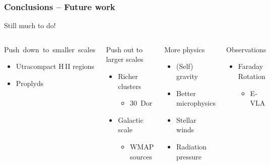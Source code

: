 \documentclass{beamer}
\begin{document}
\begin{frame}
  \frametitle{Conclusions -- Future work}
  \begin{alertblock}{\hspace*{0.25\linewidth} Still much to do!}
  \end{alertblock}
  \begin{columns}
    \begin{block}{\hbox{Push down to smaller scales}}
      \begin{itemize}
      \item Utracompact H\,II regions
      \item Proplyds
      \end{itemize}
    \end{block}
    \begin{block}{Push out to larger scales}
      \begin{itemize}
      \item Richer clusters
        \begin{itemize}
        \item 30~Dor
        \end{itemize}
      \item Galactic scale 
        \begin{itemize}
        \item WMAP sources 
        \end{itemize}
      \end{itemize}
    \end{block}

    \begin{block}{More physics}
      \begin{itemize}
      \item (Self) gravity
      \item Better microphysics
      \item Stellar winds
      \item Radiation pressure
      \end{itemize}
    \end{block}
    \begin{block}{Observations}
      \begin{itemize}
      \item Faraday Rotation
        \begin{itemize}
        \item E-VLA
        \end{itemize}
      \end{itemize}
    \end{block}

  \end{columns}
\end{frame}
\end{document}

